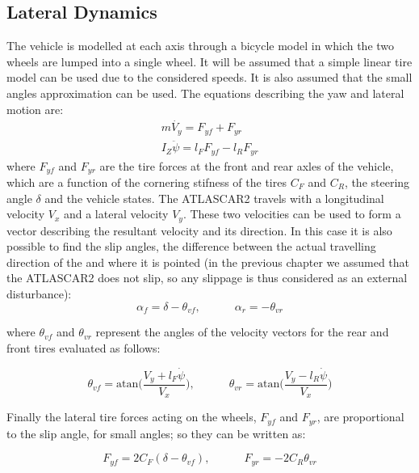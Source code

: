 \subsection{Lateral Dynamics}

The vehicle is modelled at each axis through a bicycle model in which the two wheels are lumped into a single wheel. It will be assumed that a simple linear tire model can be used due to the considered speeds. It is also assumed that the small angles approximation can be used.
The equations describing the yaw and lateral motion are:
\begin{equation}
	\label{eqn:yaw_lateral_motion}
	\begin{array}{ll}
	m\dot{V_y}=F_{yf}+F_{yr}\\
	I_Z\ddot{\psi}=l_FF_{yf}-l_RF_{yr}
	\end{array}
\end{equation}
where $F_{yf}$ and $F_{yr}$ are the tire forces at the front and rear axles of the vehicle, which are a function of the cornering stifness of the tires $C_F$ and $C_R$, the steering angle $\delta$ and the vehicle states.
The ATLASCAR2 travels with a longitudinal velocity $V_x$ and a lateral velocity $V_y$. These two velocities can be used to form a vector describing the resultant velocity and its direction. In this case it is also possible to find the slip angles, the difference between the actual travelling direction of the and where it is pointed (in the previous chapter we assumed that the ATLASCAR2 does not slip, so any slippage is thus considered as an external disturbance):
\begin{equation}
	\label{eqn:alphas}
	\alpha_f = \delta-\theta_{vf},\qquad\quad
	\alpha_r = -\theta_{vr}
\end{equation}

where $\theta_{vf}$ and $\theta_{vr}$ represent the angles of the velocity vectors for the rear and front tires evaluated as follows:

\begin{equation}
\label{eqn:theta_v}
\theta_{vf}=\text{atan}\Bigg(\frac{V_y+l_F\dot{\psi}}{V_x}\Bigg),
\qquad \quad
\theta_{vr}=\text{atan}\Bigg(\frac{V_y-l_R\dot{\psi}}{V_x}\Bigg)
\end{equation}

Finally the lateral tire forces acting on the wheels, $F_{yf}$ and $F_{yr}$, are proportional to the slip angle, for small angles; so they can be written as:

\begin{equation}
	\label{eqn:lateral_tire_forces}
	F_{yf} = 2C_F(\delta-\theta_{vf}),\qquad\quad
	F_{yr} = -2C_R\theta_{vr}
\end{equation} 

